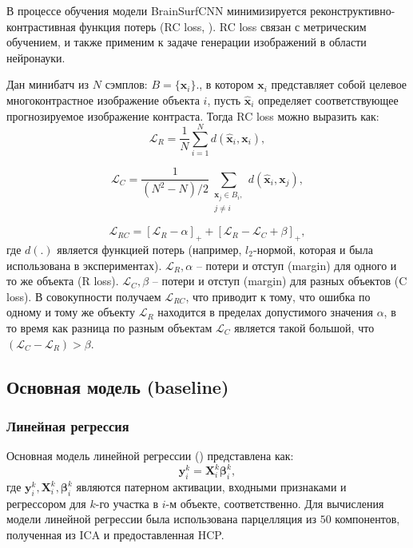 В процессе обучения модели BrainSurfCNN минимизируется реконструктивно-контрастивная функция потерь (RC loss, \cite{koch2015siamese}). 
RC loss связан с метрическим обучением, и также применим к задаче генерации изображений в области нейронауки.

Дан минибатч из $N$ сэмплов: $B=\{\textbf{x}_i\}$., в котором
$\textbf{x}_i$ представляет собой  целевое многоконтрастное изображение объекта $i$, пусть $\hat{\textbf{x}}_i$ определяет соответствующее прогнозируемое изображение контраста. Тогда RC loss можно выразить как:
\begin{equation}
    \mathcal{L}_R = \frac{1}{N} \sum\limits_{i=1}^N d(\hat{\textbf{x}}_i, {\textbf{x}}_i),
\end{equation} 

\begin{equation}
    \mathcal{L}_C = \frac{1}{(N^2-N)/2} \sum\limits_{\substack{\textbf{x}_j \in B_i, \\ j\neq i}} d(\hat{\textbf{x}}_i, {\textbf{x}}_j),
\end{equation}

\begin{equation}
    \mathcal{L}_{RC} = [\mathcal{L}_R - \alpha]_+ + [\mathcal{L}_R - \mathcal{L}_C + \beta]_+,
\end{equation}
где $d(.)$ является функцией потерь (например, $l_2$-нормой, которая и была использована в экспериментах).
$\mathcal{L}_R, \alpha$ -- потери и отступ (margin) для одного и то же объекта (R loss).
$\mathcal{L}_C, \beta$ -- потери и отступ (margin) для разных объектов (C loss). 
В совокупности получаем $\mathcal {L}_{RC}$, что приводит к тому, что ошибка по одному и тому же объекту $\mathcal{L}_{R}$ находится в пределах допустимого значения $\alpha$, в то время как разница по разным объектам $\mathcal{L}_{C}$ является такой большой, что $(\mathcal{L}_C-\mathcal{L}_R) > \beta$.


\subsection{Основная модель (baseline)}
\subsubsection{Линейная регрессия}

Основная модель линейной регрессии (\cite{tavor2016task}) представлена как:
\begin{equation}
    \boldsymbol{y}_i^k = \boldsymbol{X}_i^k \boldsymbol{\beta}_i^k,   
\end{equation}
где $\boldsymbol{y}_i^k, \boldsymbol{X}_i^k,  \boldsymbol{\beta}_i^k$ являются патерном активации, входными признаками и регрессором для $k$-го участка в $i$-м объекте, соответственно.
Для вычисления модели линейной регрессии была использована парцелляция из $50$ компонентов, полученная из ICA и предоставленная HCP. 

